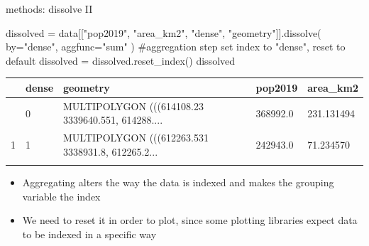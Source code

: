 \documentclass[
  ignorenonframetext,
]{beamer}
\newenvironment{Shaded}{\begin{snugshade}}{\end{snugshade}}
\newcommand{\CommentTok}[1]{\textcolor[rgb]{0.37,0.37,0.37}{#1}}
\newcommand{\NormalTok}[1]{\textcolor[rgb]{0.00,0.23,0.31}{#1}}
\newcommand{\OperatorTok}[1]{\textcolor[rgb]{0.37,0.37,0.37}{#1}}
\newcommand{\StringTok}[1]{\textcolor[rgb]{0.13,0.47,0.30}{#1}}
\providecommand{\tightlist}{%
  \setlength{\itemsep}{0pt}\setlength{\parskip}{0pt}}\usepackage{longtable,booktabs,array}
\begin{document}
\begin{frame}[fragile]{methods: dissolve II}
\label{methods-dissolve-ii}
\scriptsize

\begin{Shaded}
\begin{Highlighting}[]
\NormalTok{dissolved }\OperatorTok{=}\NormalTok{ data[[}\StringTok{"pop2019"}\NormalTok{, }\StringTok{"area\_km2"}\NormalTok{, }\StringTok{"dense"}\NormalTok{, }\StringTok{"geometry"}\NormalTok{]].dissolve(}
\NormalTok{    by}\OperatorTok{=}\StringTok{"dense"}\NormalTok{, aggfunc}\OperatorTok{=}\StringTok{"sum"}
\NormalTok{)}
\CommentTok{\#aggregation step set index to "dense", reset to default}
\NormalTok{dissolved }\OperatorTok{=}\NormalTok{ dissolved.reset\_index()}
\NormalTok{dissolved}
\end{Highlighting}
\end{Shaded}

\begin{longtable}[]{@{}lllll@{}}
\toprule\noalign{}
& dense & geometry & pop2019 & area\_km2 \\
\midrule\noalign{}
\endhead
0 & 0 & MULTIPOLYGON (((614108.23 3339640.551, 614288.... & 368992.0 &
231.131494 \\
1 & 1 & MULTIPOLYGON (((612263.531 3338931.8, 612265.2... & 242943.0 &
71.234570 \\
\bottomrule\noalign{}
\end{longtable}

\normalsize

\begin{itemize}
\tightlist
\item
  Aggregating alters the way the data is indexed and makes the grouping
  variable the index
\item
  We need to reset it in order to plot, since some plotting libraries
  expect data to be indexed in a specific way
\end{itemize}
\end{frame}
\end{document}
